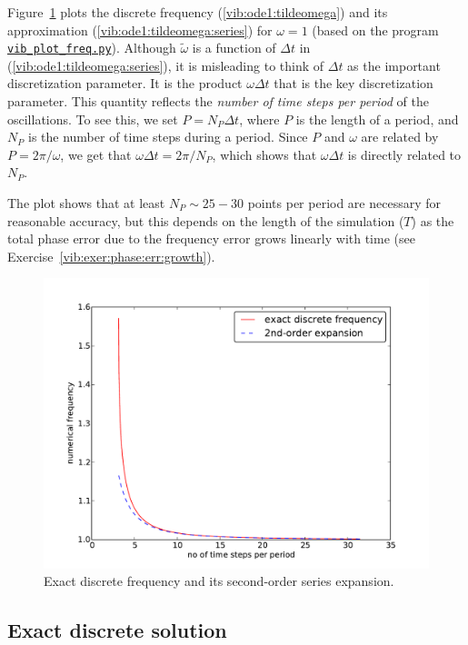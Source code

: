 \documentclass[%
oneside,                 %
final,                   %
10pt]{article}
\begin{document}
Figure~\ref{vib:ode1:tildeomega:plot} plots the discrete frequency
(\ref{vib:ode1:tildeomega})
and its approximation (\ref{vib:ode1:tildeomega:series}) for $\omega =1$ (based
on the program \href{{http://tinyurl.com/nm5587k/vib/vib_plot_freq.py}}{\nolinkurl{vib_plot_freq.py}}).
Although $\tilde\omega$ is a function of $\Delta t$ in
(\ref{vib:ode1:tildeomega:series}),
it is misleading to think of $\Delta t$ as the important
discretization parameter. It is the product $\omega\Delta t$ that is
the key discretization parameter. This quantity reflects the
\emph{number of time steps per period} of the oscillations.
To see this, we set $P=N_P\Delta t$, where $P$ is the length of
a period, and $N_P$ is the number of time steps during a period.
Since $P$ and $\omega$ are related by $P=2\pi/\omega$,
we get that $\omega\Delta t = 2\pi/N_P$, which shows that
$\omega\Delta t$ is directly related to $N_P$.

The plot shows
that at least $N_P\sim 25-30$ points per period are necessary for reasonable
accuracy, but this depends on the length of the simulation ($T$) as
the total phase error due to the frequency error grows linearly with time
(see Exercise~\ref{vib:exer:phase:err:growth}).


\begin{figure}[!ht]  %
  \centerline{\includegraphics[width=0.9\linewidth]{fig-vib/discrete_freq.pdf}}
  \caption{
  Exact discrete frequency and its second-order series expansion. \label{vib:ode1:tildeomega:plot}
  }
\end{figure}



\subsection{Exact discrete solution}
\label{vib:ode1:analysis:sol}
\end{document}

